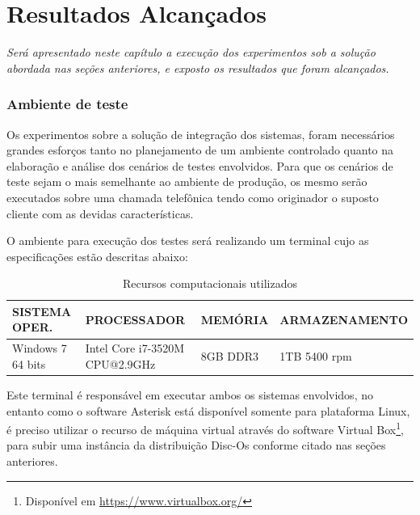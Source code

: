 \chapter[Resultados Alcançados]{\textbf{R}esultados \textbf{A}lcançados}

\textit{Será apresentado neste capítulo a execução dos experimentos sob a solução abordada nas seções anteriores, e exposto os resultados que foram alcançados.}


\subsection{Ambiente de teste}

Os experimentos sobre a solução de integração dos sistemas, foram necessários grandes esforços tanto no planejamento de um ambiente controlado quanto na elaboração e análise dos cenários de testes envolvidos. Para que os cenários de teste sejam o mais semelhante ao ambiente de produção, os mesmo serão executados sobre uma chamada telefônica tendo como originador o suposto cliente com as devidas características. 

O ambiente para execução dos testes será realizando um terminal cujo as especificações estão descritas abaixo:

\begin{table}[htb]
	\footnotesize
	\caption{Recursos computacionais utilizados}
	\label{tabela:recursosUtilizados}
	\begin{tabular}{|p{3.5cm}|p{3cm}|p{2cm}|p{4cm}|} \hline
		\textbf{SISTEMA OPER.} 	& \textbf{PROCESSADOR} 				& \textbf{MEMÓRIA} 	& \textbf{ARMAZENAMENTO}  \\ \hline
		Windows 7 64 bits 		& Intel Core i7-3520M CPU@2.9GHz 	& 8GB DDR3			& 1TB 5400 rpm \\ \hline
	\end{tabular}
\end{table}

Este terminal é responsável em executar ambos os sistemas envolvidos, no entanto como o software Asterisk está disponível somente para plataforma Linux, é preciso utilizar o recurso de máquina virtual através do software Virtual Box\footnote{Disponível em \url{https://www.virtualbox.org/}}, para subir uma instância da distribuição Disc-Os conforme citado nas seções anteriores.
 
